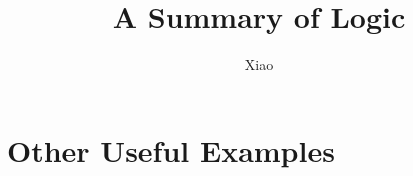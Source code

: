 \documentclass[12pt,a4paper]{report}
\theoremstyle{definition}
\theoremstyle{plain}
\theoremstyle{case}
\theoremstyle{remark}
\begin{document}
\title{A Summary of Logic}
\author{Xiao}
\date{}
\maketitle

\tableofcontents







\chapter{Other Useful Examples}
\label{monad-examples}

\appendix




\end{document}
